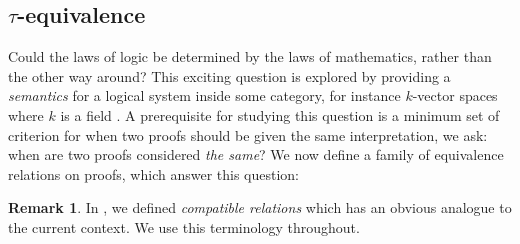 \documentclass[12pt]{article}
\theoremstyle{plain}
\theoremstyle{definition}
\newtheorem{remark}[thm]{Remark}
\begin{document}
\subsection{$\tau$-equivalence}
Could the laws of logic be determined by the laws of mathematics, rather than the other way around? This exciting question is explored by providing a \emph{semantics} for a logical system inside some category, for instance $k$-vector spaces where $k$ is a field \cite{cofree_cocommutative_coalgebra}. A prerequisite for studying this question is a minimum set of criterion for when two proofs should be given the same interpretation, we ask: when are two proofs considered \emph{the same}? We now define a family of equivalence relations on proofs, which answer this question:
\begin{remark}
In \cite{GMZ}, we defined \emph{compatible relations} which has an obvious analogue to the current context. We use this terminology throughout.
\end{remark}
\end{document}
